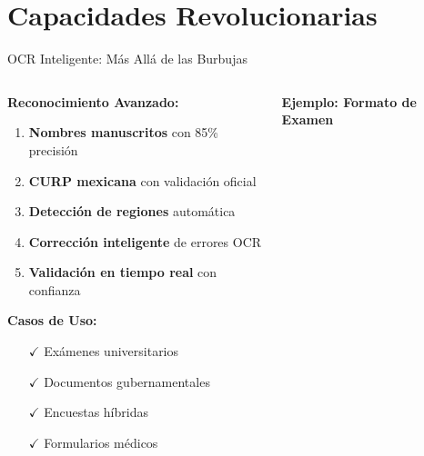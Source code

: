 \documentclass[aspectratio=169,11pt]{beamer}
\begin{document}
\section{Capacidades Revolucionarias}

\begin{frame}{OCR Inteligente: Más Allá de las Burbujas}
    \begin{columns}
        \begin{column}{0.6\textwidth}
            \textbf{\textcolor{jazzgreen}{Reconocimiento Avanzado:}}
            \begin{enumerate}
                \item \textbf{Nombres manuscritos} con 85\% precisión
                \item \textbf{CURP mexicana} con validación oficial
                \item \textbf{Detección de regiones} automática
                \item \textbf{Corrección inteligente} de errores OCR
                \item \textbf{Validación en tiempo real} con confianza
            \end{enumerate}
            
            \vspace{0.3cm}
            \textbf{\textcolor{jazzblue}{Casos de Uso:}}
            \begin{itemize}
                \item[$\checkmark$] Exámenes universitarios
                \item[$\checkmark$] Documentos gubernamentales
                \item[$\checkmark$] Encuestas híbridas
                \item[$\checkmark$] Formularios médicos
            \end{itemize}
        \end{column}
        \begin{column}{0.4\textwidth}
            \begin{center}
                \textbf{Ejemplo: Formato de Examen}
                \vspace{0.3cm}
                
\end{center}
\end{column}
\end{columns}
\end{frame}
\end{document}
